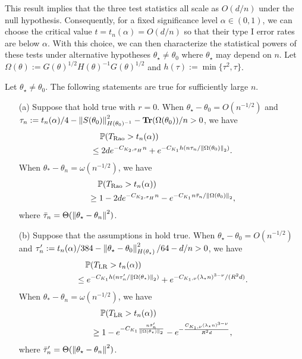 This result implies that the three test statistics all scale as $O(d / n)$ under the null hypothesis.
Consequently, for a fixed significance level $\alpha \in (0, 1)$, we can choose the critical value $t = t_n(\alpha) = O(d/n)$ so that their type I error rates are below $\alpha$.
With this choice, we can then characterize the statistical powers of these tests under alternative hypotheses $\theta_\star \neq \theta_0$ where $\theta_\star$ may depend on $n$.
Let $\Omega(\theta) := G(\theta)^{1/2} H(\theta)^{-1} G(\theta)^{1/2}$ and $h(\tau) := \min\{\tau^2, \tau\}$.

\begin{proposition}
\label{prop:power}
    Let $\theta_\star \neq \theta_0$.
    The following statements are true for sufficiently large $n$.
    \begin{enumerate}
        \item[(a)] Suppose that  hold true with $r=0$.
        When $\theta_\star - \theta_0 = O(n^{-1/2})$ and $\tau_n := t_n(\alpha)/4 - \left\lVert S(\theta_0) \right\rVert_{H(\theta_0)^{-1}}^2 - \operatorname{\bf Tr}(\Omega(\theta_0))/n > 0$, we have
        \begin{align*}
            &\quad \operatorname{\mathbb P}(T_{\text{Rao}} > t_n(\alpha)) \\
            &\le 2d e^{- C_{K_2, \sigma_H} n} + e^{-C_{K_1} h(n \tau_n/\left\lVert \Omega(\theta_0) \right\rVert_2)}.
        \end{align*}
        When $\theta_* - \theta_n = \omega(n^{-1/2})$, we have
        \begin{align*}
            &\quad \operatorname{\mathbb P}(T_{\text{Rao}} > t_n(\alpha)) \\
            &\ge 1 - 2d e^{-C_{K_2, \sigma_H} n} - e^{-C_{K_1} n \bar \tau_n/\left\lVert \Omega(\theta_0) \right\rVert_2},
        \end{align*}
        where $\bar \tau_n = \Theta(\left\lVert \theta_\star - \theta_n \right\rVert^2)$.
        
        \item[(b)] Suppose that the assumptions in  hold true.
        When $\theta_\star - \theta_0 = O(n^{-1/2})$ and $\tau_n' := t_n(\alpha)/384 - \left\lVert \theta_\star - \theta_0 \right\rVert_{H(\theta_\star)}^2/64 - d/n > 0$, we have
        \begin{align*}
            &\quad \operatorname{\mathbb P}(T_{\text{LR}} > t_n(\alpha)) \\
            &\le e^{-C_{K_1} h(n\tau_n'/\left\lVert \Omega(\theta_\star) \right\rVert_2)} + e^{-C_{K_1, \nu} (\lambda_\star n)^{3-\nu}/(R^2 d)}.
        \end{align*}
        When $\theta_* - \theta_n = \omega(n^{-1/2})$, we have
        \begin{align*}
            &\quad \operatorname{\mathbb P}(T_{\text{LR}} > t_n(\alpha)) \\
            &\ge 1 - e^{-C_{K_1} \frac{n \bar \tau_n'}{\left\lVert \Omega(\theta_\star) \right\rVert_2}} - e^{-\frac{C_{K_1, \nu} (\lambda_\star n)^{3-\nu}}{R^2 d}},
        \end{align*}
        where $\bar \tau_n' = \Theta(\left\lVert \theta_\star - \theta_n \right\rVert^2)$.
        

\end{enumerate}
\end{proposition}
